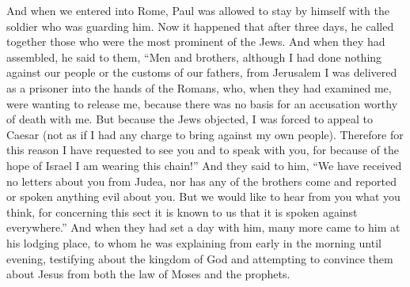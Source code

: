 \begin{biblechapter}
\verse And when we entered into Rome, Paul was allowed to stay by himself with the soldier who was guarding him.
 Now it happened that after three days, he called together those who were the most prominent of the Jews. And when they had assembled, he said to them, “Men and brothers, although I had done nothing against our people or the customs of our fathers, from Jerusalem I was delivered as a prisoner into the hands of the Romans,
\verse who, when they had examined me, were wanting to release me, because there was no basis for an accusation worthy of death with me.
\verse But because the Jews objected, I was forced to appeal to Caesar (not as if I had any charge to bring against my own people).
\verse Therefore for this reason I have requested to see you and to speak with you, for because of the hope of Israel I am wearing this chain!”
\verse And they said to him, “We have received no letters about you from Judea, nor has any of the brothers come and reported or spoken anything evil about you.
\verse But we would like to hear from you what you think, for concerning this sect it is known to us that it is spoken against everywhere.”
\verse And when they had set a day with him, many more came to him at his lodging place, to whom he was explaining from early in the morning until evening, testifying about the kingdom of God and attempting to convince them about Jesus from both the law of Moses and the prophets.

\end{biblechapter}
